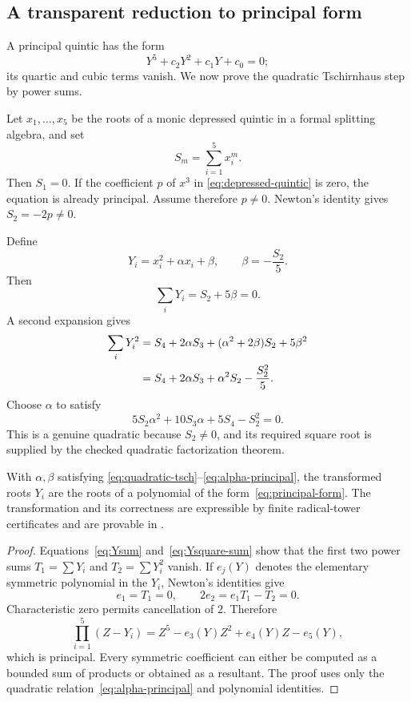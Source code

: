\subsection{A transparent reduction to principal form}

A principal quintic has the form
\begin{equation}\label{eq:principal-form}
 Y^5+c_2Y^2+c_1Y+c_0=0;
\end{equation}
its quartic and cubic terms vanish.  We now prove the quadratic Tschirnhaus
step by power sums.

Let \(x_1,\ldots,x_5\) be the roots of a monic depressed quintic in a formal
splitting algebra, and set
\[
 S_m=\sum_{i=1}^5x_i^m.
\]
Then \(S_1=0\).  If the coefficient \(p\) of \(x^3\) in
\eqref{eq:depressed-quintic} is zero, the equation is already principal.  Assume
therefore \(p\ne0\).  Newton's identity gives \(S_2=-2p\ne0\).

Define
\begin{equation}\label{eq:quadratic-tsch}
 Y_i=x_i^2+\alpha x_i+\beta,
 \qquad \beta=-\frac{S_2}{5}.
\end{equation}
Then
\begin{equation}\label{eq:Ysum}
 \sum_iY_i=S_2+5\beta=0.
\end{equation}
A second expansion gives
\begin{align}
 \sum_iY_i^2
 &=S_4+2\alpha S_3+(\alpha^2+2\beta)S_2+5\beta^2\notag\\
 &=S_4+2\alpha S_3+\alpha^2S_2-\frac{S_2^2}{5}.
 \label{eq:Ysquare-sum}
\end{align}
Choose \(\alpha\) to satisfy
\begin{equation}\label{eq:alpha-principal}
 5S_2\alpha^2+10S_3\alpha+5S_4-S_2^2=0.
\end{equation}
This is a genuine quadratic because \(S_2\ne0\), and its required square root
is supplied by the checked quadratic factorization theorem.

\begin{theorem}\label{thm:principal-reduction}
With \(\alpha,\beta\) satisfying
\eqref{eq:quadratic-tsch}--\eqref{eq:alpha-principal}, the transformed roots
\(Y_i\) are the roots of a polynomial of the form~\eqref{eq:principal-form}.
The transformation and its correctness are expressible by finite radical-tower
certificates and are provable in \ipra.
\end{theorem}

\begin{proof}
Equations~\eqref{eq:Ysum} and~\eqref{eq:Ysquare-sum} show that the first two
power sums \(T_1=\sum Y_i\) and \(T_2=\sum Y_i^2\) vanish.  If
\(e_j(Y)\) denotes the elementary symmetric polynomial in the \(Y_i\), Newton's
identities give
\[
 e_1=T_1=0,
 \qquad
 2e_2=e_1T_1-T_2=0.
\]
Characteristic zero permits cancellation of \(2\).  Therefore
\[
 \prod_{i=1}^5(Z-Y_i)
 =Z^5-e_3(Y)Z^2+e_4(Y)Z-e_5(Y),
\]
which is principal.  Every symmetric coefficient can either be computed as a
bounded sum of products or obtained as a resultant.  The proof uses only the
quadratic relation~\eqref{eq:alpha-principal} and polynomial identities.
\end{proof}

